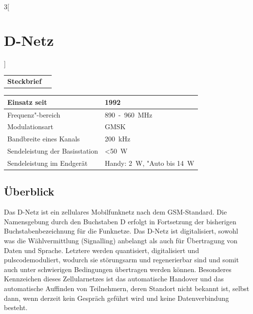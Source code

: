\begin{multicols}{3}[\section {D-Netz}]


\newrefsegment

\begin{boxedminipage}{\linewidth}
\begin{tabular}{p{}p{2.7 cm}}
\textbf{Steckbrief}& \\
\end{tabular}
\begin{tabular}{p{}|p{2.7 cm}}
      Einsatz seit & 1992\\
      \hline
      Frequenz"-bereich  & \SI{890} - \SI{960}{\mega\hertz}\\
      \hline
      Modulationsart & GMSK\\
      \hline
      Bandbreite eines Kanals & \SI{200}{\kilo\hertz}\\
      \hline
      Sendeleistung der Basisstation & <\SI{50}{\watt}\\
      \hline
      Sendeleistung im Endgerät & Handy:  \SI{2}{\watt}, "Auto bis \SI{14}{\watt}\\
\end{tabular}
\end{boxedminipage}
\par

\subsection*{Überblick}


Das D-Netz ist ein zellulares Mobilfunknetz nach dem GSM-Standard. Die Namensgebung durch den Buchstaben D erfolgt in Fortsetzung der bisherigen Buchstabenbezeichnung für die Funknetze.
Das D-Netz ist digitalisiert, sowohl was die Wählvermittlung (Signalling) anbelangt als auch für Übertragung von Daten und Sprache. Letztere werden quantisiert, digitalisiert und pulscodemoduliert, wodurch sie störungsarm und regenerierbar sind und somit auch unter schwierigen Bedingungen übertragen werden können. Besonderes Kennzeichen dieses Zellularnetzes ist das automatische Handover und das automatische Auffinden von Teilnehmern, deren Standort nicht bekannt ist, selbst dann, wenn derzeit kein Gespräch geführt wird und keine Datenverbindung besteht.


\end{multicols}
